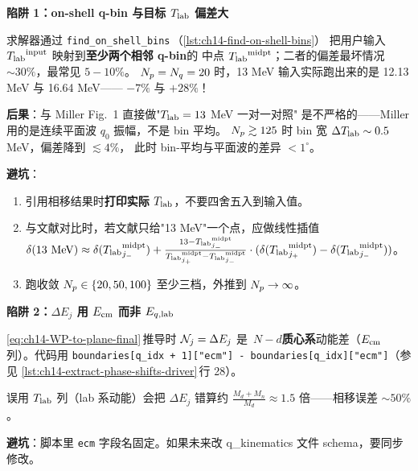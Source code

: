 \begin{pitfallbox}[label={box:ch14-pitfall-bin-mismatch}]
\textbf{陷阱 1：on-shell q-bin 与目标 \({T_{\text{lab}}}\) 偏差大}

求解器通过 \texttt{find\_on\_shell\_bins}\(\,\)（\cref{lst:ch14-find-on-shell-bins}）
把用户输入 \({T_{\text{lab}}}^{\rm input}\) 映射到\textbf{至少两个相邻 q-bin}的
中点 \({T_{\text{lab}}}^{\rm midpt}\)；二者的偏差最坏情况 \(\sim 30\%\)，最常见 \(5\!-\!10\%\)。
\(N_p = N_q = 20\) 时，13 MeV 输入实际跑出来的是 12.13 MeV 与 16.64 MeV——
\(-7\%\) 与 \(+28\%\)！

\textbf{后果}：与 Miller Fig.~1 直接做"\({T_{\text{lab}}} = 13\) MeV 一对一对照"
是不严格的——Miller 用的是连续平面波 \(q_0\) 振幅，不是 bin 平均。
\(N_p \gtrsim 125\) 时 bin 宽 \(\Delta{T_{\text{lab}}} \sim 0.5\) MeV，偏差降到 \(\lesssim 4\%\)，
此时 bin-平均与平面波的差异 \(< 1^\circ\)。

\textbf{避坑}：
\begin{enumerate}
  \item 引用相移结果时\textbf{打印实际 \({T_{\text{lab}}}\)}，不要四舍五入到输入值。
  \item 与文献对比时，若文献只给"13 MeV"一个点，应做线性插值
        \(\delta(13~\text{MeV}) \approx \delta({T_{\text{lab}}}^{\rm midpt}_{j_-}) + \frac{13 -
        {T_{\text{lab}}}^{\rm midpt}_{j_-}}{{T_{\text{lab}}}^{\rm midpt}_{j_+} - {T_{\text{lab}}}^{\rm midpt}_{j_-}}
        \cdot (\delta({T_{\text{lab}}}^{\rm midpt}_{j_+}) - \delta({T_{\text{lab}}}^{\rm midpt}_{j_-}))\)。
  \item 跑收敛 \(N_p \in \{20, 50, 100\}\) 至少三档，外推到 \(N_p \to \infty\)。
\end{enumerate}
\end{pitfallbox}

\begin{pitfallbox}[label={box:ch14-pitfall-Delta-E-units}]
\textbf{陷阱 2：\(\Delta E_j\) 用 \(E_{\rm cm}\) 而非 \(E_{q,{\rm lab}}\)}

\cref{eq:ch14-WP-to-plane-final}\(\,\)推导时 \(\mathcal{N}_j = \Delta E_j\) 是
\(\,N\!-\!d\)\textbf{质心系}动能差（\(E_{\rm cm}\) 列）。代码用
\verb|boundaries[q_idx + 1]["ecm"] - boundaries[q_idx]["ecm"]|（参见
\cref{lst:ch14-extract-phase-shifts-driver}\(\,\)行 28）。

误用 \({T_{\text{lab}}}\) 列（lab 系动能）会把 \(\Delta E_j\) 错算约 \(\frac{M_d + M_n}{M_d}
\approx 1.5\) 倍——相移误差 \(\sim 50\%\)。

\textbf{避坑}：脚本里 \texttt{ecm} 字段名固定。如果未来改 q\_kinematics 文件
schema，要同步修改。
\end{pitfallbox}

